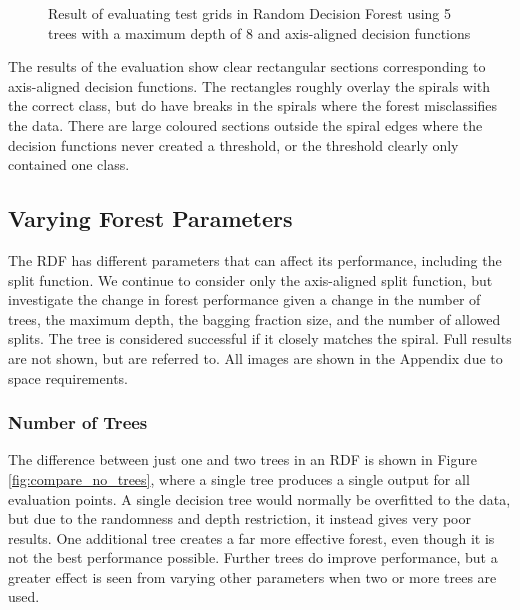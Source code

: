 \documentclass[a4paper, 10pt, conference]{ieeeconf}
\begin{document}
\begin{figure}[!ht]
  \caption{Result of evaluating test grids in Random Decision Forest using 5 trees with a maximum depth of 8 and axis-aligned decision functions}
  \label{fig:grid_eval}
\end{figure}

The results of the evaluation show clear rectangular sections corresponding to axis-aligned decision functions. The rectangles roughly overlay the spirals with the correct class, but do have breaks in the spirals where the forest misclassifies the data. There are large coloured sections outside the spiral edges where the decision functions never created a threshold, or the threshold clearly only contained one class.

\subsection{Varying Forest Parameters}

The RDF has different parameters that can affect its performance, including the split function. We continue to consider only the axis-aligned split function, but investigate the change in forest performance given a change in the number of trees, the maximum depth, the bagging fraction size, and the number of allowed splits. The tree is considered successful if it closely matches the spiral. Full results are not shown, but are referred to.
All images are shown in the Appendix due to space requirements.

\subsubsection{Number of Trees}

The difference between just one and two trees in an RDF is shown in Figure \ref{fig:compare_no_trees}, where a single tree produces a single output for all evaluation points. A single decision tree would normally be overfitted to the data, but due to the randomness and depth restriction, it instead gives very poor results. One additional tree creates a far more effective forest, even though it is not the best performance possible. Further trees do improve performance, but a greater effect is seen from varying other parameters when two or more trees are used.
\end{document}
